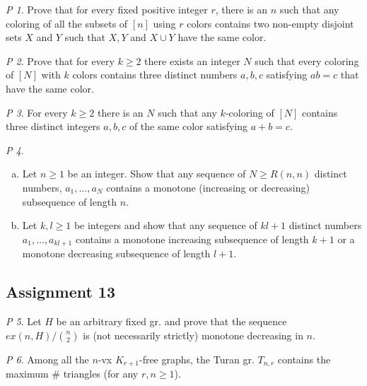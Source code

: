 \documentclass[11pt, fleqn, a4paper, landscape]{article}
\theoremstyle{plain} %
\theoremstyle{remark} %
\newtheorem{problem}{P}
\theoremstyle{definition} %
\begin{document}
\begin{multicols}{5}
\begin{problem}
Prove that for every fixed positive integer $r$, there is an $n$ such that any coloring of all the subsets of $[n] $ using $r$ colors contains two non-empty disjoint sets $X$ and $Y$ such that $X, Y $ and $X \cup Y$ have the same color.
\end{problem}

\begin{problem}
Prove that for every $k \ge 2$ there exists an integer $N$ such that every coloring of $[N]$ with $k$ colors contains three distinct numbers $a, b, c$ satisfying $ab = c$ that have the same color.
\end{problem}

\begin{problem}
For every $k\ge 2$ there is an $N$ such that any $k$-coloring of $[N]$ contains three distinct integers $a, b, c$ of the same color satisfying $a + b = c.$
\end{problem}

\begin{problem}
\begin{enumerate}[(a)]
\item Let $n\ge 1$ be an integer. Show that any sequence of $N\ge R(n, n)$  distinct numbers, $a_1,\dots, a_N$ contains a monotone (increasing or decreasing) subsequence of length $n$.
\item Let $k, l \ge1$ be integers and show that any sequence of $kl+1$ distinct numbers $a_1,\dots, a_{kl+1}$ contains a monotone increasing subsequence of length $k + 1$ or a monotone decreasing
subsequence of length $l + 1$.
\end{enumerate}
\end{problem}

\subsection{Assignment 13}

\begin{problem}
Let $H$ be an arbitrary fixed gr. and prove that the sequence $ex(n,H)/\binom{n}{2}$ is (not necessarily strictly) monotone decreasing in $n$.
\end{problem}

\begin{problem}
Among all the $n$-vx $K_{r+1}$-free graphs, the Turan gr. $T_{n,r}$ contains the maximum \# triangles (for any $r, n \ge 1$).
\end{problem}


\end{multicols}
\end{document}
